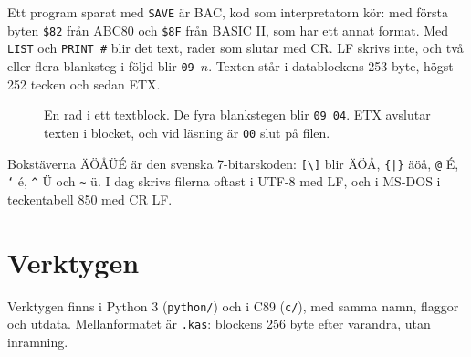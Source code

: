 \documentclass[10pt]{article}
\newcommand\kw[1]{\texttt{#1}}
\newcommand\adr[1]{\texttt{\$#1}}
\begin{document}
Ett program sparat med \kw{SAVE} är BAC, kod som interpretatorn kör: med
första byten \adr{82} från ABC80 och \adr{8F} från BASIC II, som har ett
annat format. Med \kw{LIST} och \kw{PRINT~\#} blir det text, rader som
slutar med CR. LF skrivs inte, och två eller flera blanksteg i följd blir
\kw{09}~$n$. Texten står i datablockens 253 byte, högst 252 tecken och
sedan ETX.

\begin{figure}[H]
\centering
{}
\caption{En rad i ett textblock. De fyra blankstegen blir \kw{09 04}.
ETX avslutar texten i blocket, och vid läsning är \kw{00} slut på filen.}
\end{figure}

Bokstäverna ÄÖÅÜÉ är den svenska 7-bitarskoden: \kw{[\textbackslash]}
blir ÄÖÅ, \kw{\{|\}} äöå, \kw{@} É, \kw{`} é, \kw{\textasciicircum} Ü och
\kw{\textasciitilde} ü. I dag skrivs filerna oftast i UTF-8 med LF, och i
MS-DOS i teckentabell 850 med CR LF.

\section{Verktygen}

Verktygen finns i Python 3 (\kw{python/}) och i C89 (\kw{c/}), med samma
namn, flaggor och utdata. Mellanformatet är \kw{.kas}: blockens 256 byte
efter varandra, utan inramning.
\end{document}
